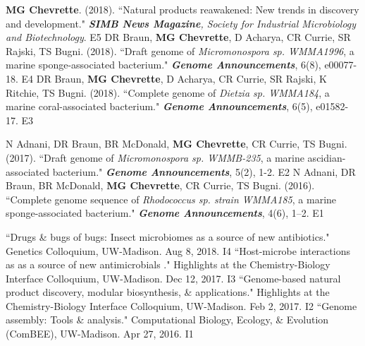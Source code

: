 \begin{cvpubs}
  \cvpub
    {\textbf{MG Chevrette}. (2018). ``Natural products reawakened: New trends in discovery and development." \textit{\textbf{SIMB News Magazine}, Society for Industrial Microbiology and Biotechnology}. }  %
    {E5} %
  \cvpub
    {DR Braun, \textbf{MG Chevrette}, D Acharya, CR Currie, SR Rajski, TS Bugni. (2018). ``Draft genome of \textit{Micromonospora sp. WMMA1996}, a marine sponge-associated bacterium." \textit{\textbf{Genome Announcements}}, 6(8), e00077-18. \textbf{\textit{}} }  %
    {E4} %
  \cvpub
    {DR Braun, \textbf{MG Chevrette}, D Acharya, CR Currie, SR Rajski, K Ritchie, TS Bugni. (2018). ``Complete genome of \textit{Dietzia sp. WMMA184}, a marine coral-associated bacterium." \textit{\textbf{Genome Announcements}}, 6(5), e01582-17. \textbf{\textit{}} } %
    {E3} %
\end{cvpubs}
\begin{cvpubs}
  \cvpub
    {N Adnani, DR Braun, BR McDonald, \textbf{MG Chevrette}, CR Currie, TS Bugni. (2017). ``Draft genome of \textit{Micromonospora sp. WMMB-235}, a marine ascidian-associated bacterium." \textit{\textbf{Genome Announcements}}, 5(2), 1-2. \textbf{\textit{}} } %
    {E2} %
  \cvpub
  {N Adnani, DR Braun, BR McDonald, \textbf{MG Chevrette}, CR Currie, TS Bugni. (2016). ``Complete genome sequence of \textit{Rhodococcus sp. strain WMMA185}, a marine sponge-associated bacterium." \textit{\textbf{Genome Announcements}}, 4(6), 1–2. \textbf{\textit{}}} %
    {E1} %
\end{cvpubs}


\begin{cvpubs} 
  \cvpub
    {``Drugs \& bugs of bugs: Insect microbiomes as a source of new antibiotics." Genetics Colloquium, UW-Madison. Aug 8, 2018.} %
    {I4} %
  \cvpub
    {``Host-microbe interactions as as a source of new antimicrobials
." Highlights at the Chemistry-Biology Interface Colloquium, UW-Madison. Dec 12, 2017.} %
    {I3} %
  \cvpub
    {``Genome-based natural product discovery, modular biosynthesis, \& applications." Highlights at the Chemistry-Biology Interface Colloquium, UW-Madison. Feb 2, 2017.} %
    {I2} %
  \cvpub
    {``Genome assembly: Tools \& analysis." Computational Biology, Ecology, \& Evolution (ComBEE), UW-Madison. Apr 27, 2016.} %
    {I1} %
\end{cvpubs}


